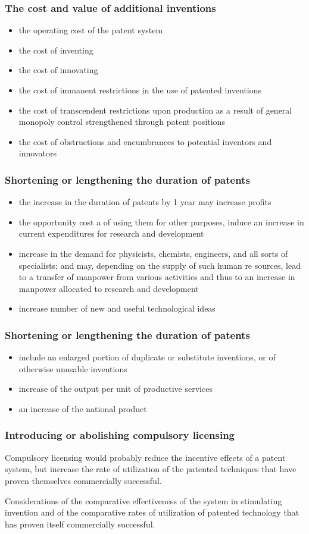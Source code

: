 \begin{frame}
\frametitle{The cost and value of additional inventions}
\begin{itemize}
	\item the operating cost of the patent system
    \item the cost of inventing
    \item the cost of innovating
    \item the cost of immanent restrictions in the use of patented inventions
    \item the cost of transcendent restrictions upon production as a result of general monopoly control strengthened through patent positions
    \item the cost of obstructions and encumbrances to potential inventors and innovators
\end{itemize}
\end{frame}



\begin{frame}
\frametitle{Shortening or lengthening the duration of patents}
\begin{itemize}
	\item the increase in the duration of patents by 1 year may increase profits
    \item the opportunity cost a of using them for other purposes, induce an increase in current expenditures for research and development
    \item increase in the demand for physicists, chemists, engineers, and all sorts of specialists; and may, depending on the supply of such human re sources, lead to a transfer of manpower from various activities and thus to an increase in manpower allocated to research and development
    \item increase number of new and useful technological ideas
\end{itemize}
\end{frame}

\begin{frame}
\frametitle{Shortening or lengthening the duration of patents}
\begin{itemize}
    \item include an enlarged portion of duplicate or substitute inventions, or of otherwise unusable inventions
    \item increase of the output per unit of productive services
    \item an increase of the national product
\end{itemize}
\end{frame}

\begin{frame}
\frametitle{Introducing or abolishing compulsory licensing}
Compulsory licensing would probably reduce the incentive effects of a patent system, but increase the rate of utilization of the patented techniques that have proven themselves commercially successful.

Considerations of the comparative effectiveness of the system in stimulating invention and of the comparative rates of utilization of patented technology that has proven itself commercially successful.
\end{frame}
